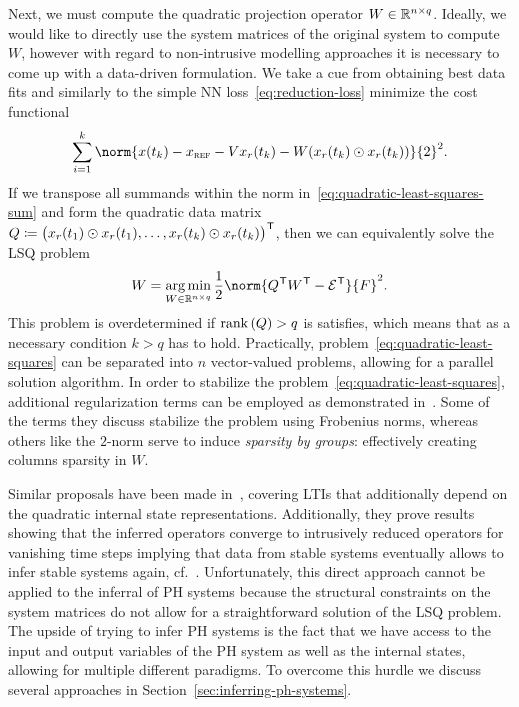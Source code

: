 Next, we must compute the quadratic projection operator $W \in \mathbb{R}^{n \times q}$.
Ideally, we would like to directly use the system matrices of the original system to compute $W$, however with regard to non-intrusive modelling approaches it is necessary to come up with a data-driven formulation.
We take a cue from obtaining best data fits and similarly to the simple \ac{NN} loss~\eqref{eq:reduction-loss} minimize the cost functional
\begin{equation}\label{eq:quadratic-least-squares-sum}
    \sum\limits_{i = 1}^k \norm{x(t_k) - x_\msc{ref} - V x_r(t_k) - W (x_r(t_k) \odot x_r(t_k))}{2}^2.
\end{equation}
If we transpose all summands within the norm in~\eqref{eq:quadratic-least-squares-sum} and form the quadratic data matrix $Q \coloneqq {\big( x_r(t_1) \odot x_r(t_1), \dots, x_r(t_k) \odot x_r(t_k) \big)}^{\mkern1mu \mathsf{T}}$, then we can equivalently solve the \ac{LSQ} problem
\begin{equation}\label{eq:quadratic-least-squares}
    W = \argmin\limits_{W \in \bb{R}^{n \times q}} \frac{1}{2} \norm{Q\trans W\trans - \mcl{E}\trans}{F}^2.
\end{equation}
This problem is overdetermined if $\mathop{}\!\mathrm{rank}\left(Q\right) > q$ is satisfies, which means that as a necessary condition $k > q$ has to hold.
Practically, problem~\eqref{eq:quadratic-least-squares} can be separated into $n$ vector-valued problems, allowing for a parallel solution algorithm.
In order to stabilize the problem~\eqref{eq:quadratic-least-squares}, additional regularization terms can be employed as demonstrated in~\cite[Equation~15]{Geelen2023}.
Some of the terms they discuss stabilize the problem using Frobenius norms, whereas others like the $2$-norm serve to induce \emph{sparsity by groups}: effectively creating columns sparsity in $W$.



Similar proposals have been made in~\cite{Peherstorfer2016}, covering \acp{LTI} that additionally depend on the quadratic internal state representations.
Additionally, they prove results showing that the inferred operators converge to intrusively reduced operators for vanishing time steps implying that data from stable systems eventually allows to infer stable systems again, cf.~\cite[Theorem~1, Corollary~1]{Peherstorfer2016}.
Unfortunately, this direct approach cannot be applied to the inferral of \ac{PH} systems because the structural constraints on the system matrices do not allow for a straightforward solution of the \ac{LSQ} problem.
The upside of trying to infer \ac{PH} systems is the fact that we have access to the input and output variables of the \ac{PH} system as well as the internal states, allowing for multiple different paradigms.
To overcome this hurdle we discuss several approaches in Section~\ref{sec:inferring-ph-systems}.
